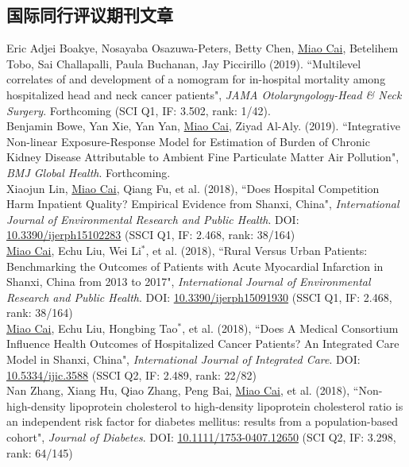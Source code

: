 \documentclass[11pt, a4paper]{article}
\newcommand{\years}[1]{\marginnote{\scriptsize #1}}
\begin{document}
\subsection*{国际同行评议期刊文章}
\noindent
\years{2019}Eric Adjei Boakye, Nosayaba Osazuwa-Peters, Betty Chen, \underline{Miao Cai}, Betelihem Tobo, Sai Challapalli, Paula Buchanan, Jay Piccirillo (2019). ``Multilevel correlates of and development of a nomogram for in-hospital mortality among hospitalized head and neck cancer patients", \emph{JAMA Otolaryngology-Head \& Neck Surgery}. Forthcoming (SCI Q1, IF: 3.502, rank: 1/42).\\
\years{2019}Benjamin Bowe, Yan Xie, Yan Yan, \underline{Miao Cai}, Ziyad Al-Aly. (2019). ``Integrative Non-linear Exposure-Response Model for Estimation of Burden of Chronic Kidney Disease Attributable to Ambient Fine Particulate Matter Air Pollution", \emph{BMJ Global Health}. Forthcoming. \\
\years{2018}Xiaojun Lin, \underline{Miao Cai}, Qiang Fu, et al. (2018), ``Does Hospital Competition Harm Inpatient Quality? Empirical Evidence from Shanxi, China", \emph{International Journal of Environmental Research and Public Health}. DOI: \href{https://doi.org/10.3390/ijerph15102283}{10.3390/ijerph15102283} (SSCI Q1, IF: 2.468, rank: 38/164)\\
\years{2018}\underline{Miao Cai}, Echu Liu, Wei Li$^\ast$, et al. (2018), ``Rural Versus Urban Patients: Benchmarking the Outcomes of Patients with Acute Myocardial Infarction in Shanxi, China from 2013 to 2017", \emph{International Journal of Environmental Research and Public Health}. DOI: \href{https://doi.org/10.3390/ijerph15091930}{10.3390/ijerph15091930} (SSCI Q1, IF: 2.468, rank: 38/164)\\
\years{2018}\underline{Miao Cai}, Echu Liu, Hongbing Tao$^\ast$, et al. (2018), ``Does A Medical Consortium Influence Health Outcomes of Hospitalized Cancer Patients? An Integrated Care Model in Shanxi, China", \emph{International Journal of Integrated Care}. DOI: \href{https://doi.org/10.5334/ijic.3588}{10.5334/ijic.3588} (SSCI Q2, IF: 2.489, rank: 22/82)\\
\years{2018}Nan Zhang, Xiang Hu, Qiao Zhang, Peng Bai, \underline{Miao Cai}, et al. (2018), ``Non-high-density lipoprotein cholesterol to high-density lipoprotein cholesterol ratio is an independent risk factor for diabetes mellitus: results from a population-based cohort", \emph{Journal of Diabetes}. DOI: \href{https://doi.org/10.1111/1753-0407.12650}{10.1111/1753-0407.12650} (SCI Q2, IF: 3.298, rank: 64/145)\\
\end{document}
